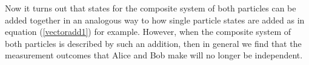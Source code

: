 Now it turns out that states for the composite system of both particles can be added together in an analogous way to how single particle states are added as in equation (\ref{vectoradd1}) for example. However, when the composite system of both particles is described by such an addition, then in general we find that the measurement outcomes that Alice and Bob make will no longer be independent. 
 